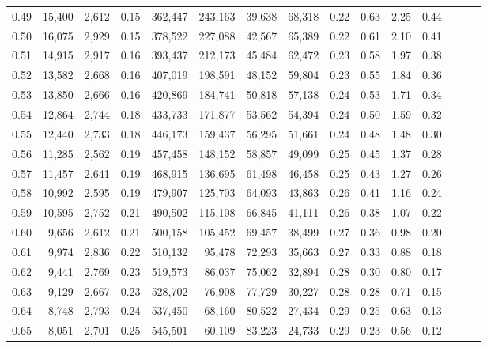 \begin{tabular}{rrrrrrrrrrrrrrr}
0.49 &  15,400 &  2,612 &  0.15 &  362,447 &  243,163 &   39,638 &   68,318 &  0.22 &  0.63 &  2.25 &      0.44 \\
0.50 &  16,075 &  2,929 &  0.15 &  378,522 &  227,088 &   42,567 &   65,389 &  0.22 &  0.61 &  2.10 &      0.41 \\
0.51 &  14,915 &  2,917 &  0.16 &  393,437 &  212,173 &   45,484 &   62,472 &  0.23 &  0.58 &  1.97 &      0.38 \\
0.52 &  13,582 &  2,668 &  0.16 &  407,019 &  198,591 &   48,152 &   59,804 &  0.23 &  0.55 &  1.84 &      0.36 \\
0.53 &  13,850 &  2,666 &  0.16 &  420,869 &  184,741 &   50,818 &   57,138 &  0.24 &  0.53 &  1.71 &      0.34 \\
0.54 &  12,864 &  2,744 &  0.18 &  433,733 &  171,877 &   53,562 &   54,394 &  0.24 &  0.50 &  1.59 &      0.32 \\
0.55 &  12,440 &  2,733 &  0.18 &  446,173 &  159,437 &   56,295 &   51,661 &  0.24 &  0.48 &  1.48 &      0.30 \\
0.56 &  11,285 &  2,562 &  0.19 &  457,458 &  148,152 &   58,857 &   49,099 &  0.25 &  0.45 &  1.37 &      0.28 \\
0.57 &  11,457 &  2,641 &  0.19 &  468,915 &  136,695 &   61,498 &   46,458 &  0.25 &  0.43 &  1.27 &      0.26 \\
0.58 &  10,992 &  2,595 &  0.19 &  479,907 &  125,703 &   64,093 &   43,863 &  0.26 &  0.41 &  1.16 &      0.24 \\
0.59 &  10,595 &  2,752 &  0.21 &  490,502 &  115,108 &   66,845 &   41,111 &  0.26 &  0.38 &  1.07 &      0.22 \\
0.60 &   9,656 &  2,612 &  0.21 &  500,158 &  105,452 &   69,457 &   38,499 &  0.27 &  0.36 &  0.98 &      0.20 \\
0.61 &   9,974 &  2,836 &  0.22 &  510,132 &   95,478 &   72,293 &   35,663 &  0.27 &  0.33 &  0.88 &      0.18 \\
0.62 &   9,441 &  2,769 &  0.23 &  519,573 &   86,037 &   75,062 &   32,894 &  0.28 &  0.30 &  0.80 &      0.17 \\
0.63 &   9,129 &  2,667 &  0.23 &  528,702 &   76,908 &   77,729 &   30,227 &  0.28 &  0.28 &  0.71 &      0.15 \\
0.64 &   8,748 &  2,793 &  0.24 &  537,450 &   68,160 &   80,522 &   27,434 &  0.29 &  0.25 &  0.63 &      0.13 \\
0.65 &   8,051 &  2,701 &  0.25 &  545,501 &   60,109 &   83,223 &   24,733 &  0.29 &  0.23 &  0.56 &      0.12 \\

\end{tabular}
